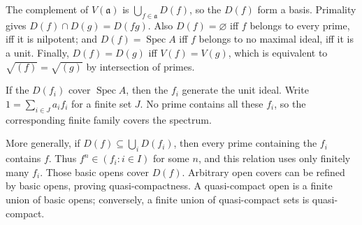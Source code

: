 The complement of $V(\mathfrak a)$ is $\bigcup_{f\in\mathfrak a}D(f)$, so the $D(f)$ form a basis. Primality gives $D(f)\cap D(g)=D(fg)$. Also $D(f)=\varnothing$ iff $f$ belongs to every prime, iff it is nilpotent; and $D(f)=\operatorname{Spec}A$ iff $f$ belongs to no maximal ideal, iff it is a unit. Finally, $D(f)=D(g)$ iff $V(f)=V(g)$, which is equivalent to $\sqrt{(f)}=\sqrt{(g)}$ by intersection of primes.

If the $D(f_i)$ cover $\operatorname{Spec}A$, then the $f_i$ generate the unit ideal. Write $1=\sum_{i\in J}a_if_i$ for a finite set $J$. No prime contains all these $f_i$, so the corresponding finite family covers the spectrum.

More generally, if $D(f)\subseteq\bigcup_iD(f_i)$, then every prime containing the $f_i$ contains $f$. Thus $f^n\in(f_i:i\in I)$ for some $n$, and this relation uses only finitely many $f_i$. Those basic opens cover $D(f)$. Arbitrary open covers can be refined by basic opens, proving quasi-compactness. A quasi-compact open is a finite union of basic opens; conversely, a finite union of quasi-compact sets is quasi-compact.
